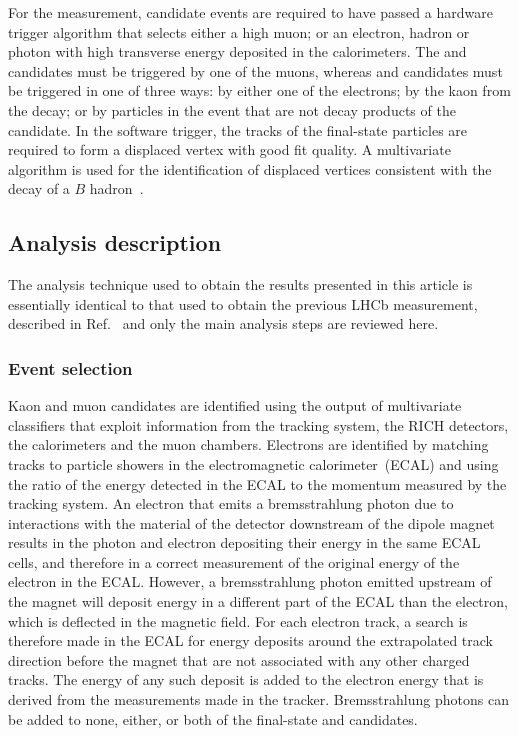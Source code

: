 For the \RK measurement, candidate events are  required to have passed a hardware trigger algorithm that selects either a high \pt muon; or an electron, hadron or photon with high transverse energy deposited in the calorimeters. The \BuKmm and \BuJpsiKmm candidates must be triggered by one of the muons, whereas \BuKee and \BuJpsiKee candidates must be triggered in one of three ways: by either one of the electrons; by the kaon from the \Bp decay; or by particles in the event that are not decay products of the \Bp candidate. In the software trigger, the tracks of the final-state particles are required to form a displaced vertex with good fit quality. A multivariate algorithm is used for the identification of displaced vertices consistent with the decay of a $B$ hadron~\cite{BBDT, LHCb-PROC-2015-018}.

\subsection*{Analysis description}

The analysis technique used to obtain the results presented in this article is essentially identical to that used to obtain the previous LHCb \RK measurement, described in Ref.~\cite{LHCb-PAPER-2019-009} and only the main analysis steps are reviewed here. 

\subsubsection*{Event selection} 

Kaon and muon candidates are identified using the output of multivariate classifiers that exploit information from the tracking system, the RICH detectors, the calorimeters and the muon chambers.
Electrons are identified by matching tracks to  particle showers in the electromagnetic calorimeter~(ECAL) and using the ratio of the energy detected in the ECAL to the momentum measured by the tracking system. 
An electron that emits a bremsstrahlung photon due to interactions with the material of the detector downstream of the dipole magnet results in the photon and electron depositing their energy in the same ECAL cells, and therefore in a correct measurement of the original energy of the electron in the ECAL. However, a bremsstrahlung photon emitted upstream of the magnet  will deposit energy in a different part of the ECAL than the electron, which is deflected in the magnetic field. For each electron track, a search is therefore made in the ECAL for energy deposits around the extrapolated track direction before the magnet that are not associated with any other charged tracks. The energy of any such deposit is added to the electron energy that is derived from the measurements made in the tracker. Bremsstrahlung photons can be added to none, either, or both of the final-state \ep and \en candidates. 

